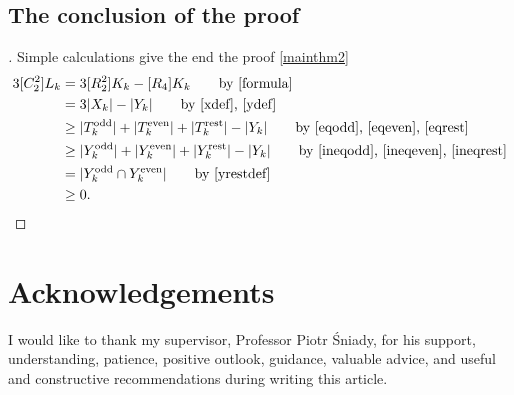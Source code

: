 \documentclass[submission]{FPSAC2021}
\DeclareMathOperator{\odd}{odd}
\DeclareMathOperator{\even}{even}
\DeclareMathOperator{\rest}{rest}
\begin{document}
\subsection{The conclusion of the proof}
\begin{proof}[\unskip\nopunct]
Simple calculations give the end the proof \cref{mainthm2}
\begin{align*}
3[C_2^2]L_k & =3[R_2^2]K_k-[R_4]K_k \tag*{by \eqref{formula}}\\ 
& =3|X_k|-|Y_k| \tag*{by \eqref{xdef}, \eqref{ydef}}\\ 
& \geq |T_k^{\odd}|+|T_k^{\even}|+|T_k^{\rest}|-|Y_k| \tag*{by \eqref{eqodd},
\eqref{eqeven}, \eqref{eqrest}}\\ & \geq |Y_k^{\odd}|+|Y_k^{\even}|+|
Y_k^{\rest}|-|Y_k| \tag*{by \eqref{ineqodd}, \eqref{ineqeven}, \eqref{ineqrest}}\\
& =|Y_k^{\odd} \cap Y_k^{\even}| \tag*{by \eqref{yrestdef}}\\ 
& \geq 0.
\end{align*}
\end{proof}

\section*{Acknowledgements}

I would like to thank my supervisor, Professor Piotr
Śniady, for his support, understanding, patience, 
positive outlook, guidance, valuable advice, and 
useful and constructive recommendations during
writing this article.

\printbibliography 
\end{document}
